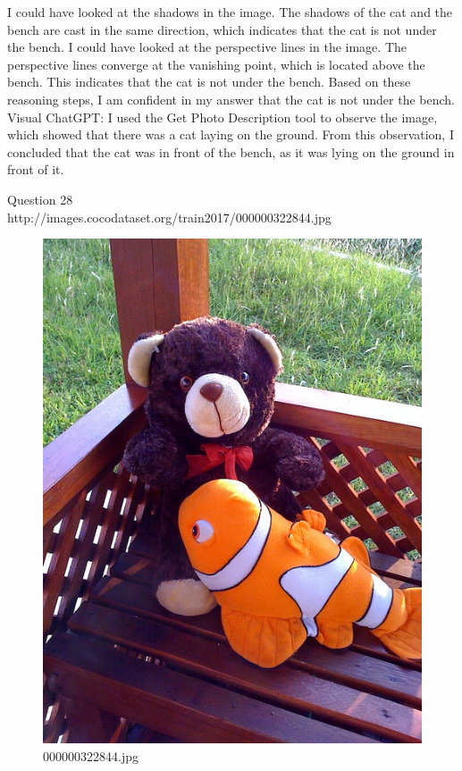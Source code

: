 \begin{enumerate}
        I could have looked at the shadows in the image. The shadows of the cat and the bench are cast in the same direction, which indicates that the cat is not under the bench.
        I could have looked at the perspective lines in the image. The perspective lines converge at the vanishing point, which is located above the bench. This indicates that the cat is not under the bench.
        Based on these reasoning steps, I am confident in my answer that the cat is not under the bench.
        \subitem Visual ChatGPT: I used the Get Photo Description tool to observe the image, which showed that there was a cat laying on the ground. From this observation, I concluded that the cat was in front of the bench, as it was lying on the ground in front of it.
    \end{enumerate}
Question 28\\
    http://images.cocodataset.org/train2017/000000322844.jpg
    \begin{figure}[h]
        \centering
        \includegraphics[width=0.8\linewidth]{../image set/easy/000000322844.jpg}
        \caption{000000322844.jpg}
    \end{figure}
